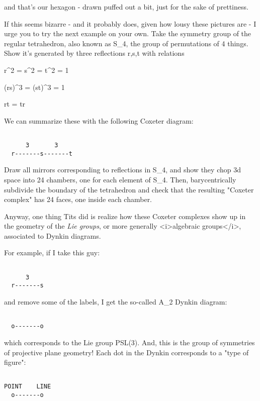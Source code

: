 and that's our hexagon - drawn puffed out a bit, just for the sake
of prettiness.

If this seems bizarre - and it probably does, given how lousy these
pictures are - I urge you to try the next example on your own.  Take
the symmetry group of the regular tetrahedron, also known as S_{4},
the group of permutations of 4 things.  Show it's generated by 
three reflections r,s,t with relations

r^{2} = s^{2} = t^{2} = 1

(rs)^{3} = (st)^{3} = 1

rt = tr

We can summarize these with the following Coxeter diagram:


\begin{verbatim}

      3       3
  r-------s-------t
\end{verbatim}
    
Draw all mirrors corresponding to reflections in S_{4}, and show 
they chop 3d space into 24 chambers, one for each element of S_{4}. 
Then, barycentrically subdivide the boundary of the tetrahedron 
and check that the resulting "Coxeter complex" has 24 faces, one 
inside each chamber.

Anyway, one thing Tits did is realize how these Coxeter complexes 
show up in the geometry of the \emph{Lie groups}, or more generally
<i>algebraic groups</i>, associated to Dynkin diagrams.  

For example, if I take this guy:


\begin{verbatim}

      3
  r-------s
\end{verbatim}
    

and remove some of the labels, I get the so-called A_{2}
Dynkin diagram:


\begin{verbatim}

  o-------o
\end{verbatim}
    
which corresponds to the Lie group PSL(3).  And, this is the group 
of symmetries of projective plane geometry!  Each dot in the Dynkin
corresponds to a "type of figure":


\begin{verbatim}

POINT    LINE
  o-------o
\end{verbatim}
    
